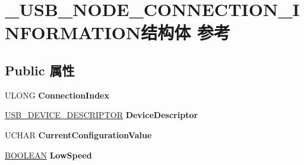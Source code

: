 \hypertarget{struct___u_s_b___n_o_d_e___c_o_n_n_e_c_t_i_o_n___i_n_f_o_r_m_a_t_i_o_n}{}\section{\+\_\+\+U\+S\+B\+\_\+\+N\+O\+D\+E\+\_\+\+C\+O\+N\+N\+E\+C\+T\+I\+O\+N\+\_\+\+I\+N\+F\+O\+R\+M\+A\+T\+I\+O\+N结构体 参考}
\label{struct___u_s_b___n_o_d_e___c_o_n_n_e_c_t_i_o_n___i_n_f_o_r_m_a_t_i_o_n}
\subsection*{Public 属性}
\begin{DoxyCompactItemize}
\item 
\mbox{\label{struct___u_s_b___n_o_d_e___c_o_n_n_e_c_t_i_o_n___i_n_f_o_r_m_a_t_i_o_n_a99e385dc6873d20dfe01bc77a3c994c9}} 
U\+L\+O\+NG {\bfseries Connection\+Index}
\item 
\mbox{\label{struct___u_s_b___n_o_d_e___c_o_n_n_e_c_t_i_o_n___i_n_f_o_r_m_a_t_i_o_n_a27e9c5b754a5b5a30ab646dc04860934}} 
\hyperlink{struct___u_s_b___d_e_v_i_c_e___d_e_s_c_r_i_p_t_o_r}{U\+S\+B\+\_\+\+D\+E\+V\+I\+C\+E\+\_\+\+D\+E\+S\+C\+R\+I\+P\+T\+OR} {\bfseries Device\+Descriptor}
\item 
\mbox{\label{struct___u_s_b___n_o_d_e___c_o_n_n_e_c_t_i_o_n___i_n_f_o_r_m_a_t_i_o_n_a25043404c6023c8195a577a19cf23ebf}} 
U\+C\+H\+AR {\bfseries Current\+Configuration\+Value}
\item 
\mbox{\label{struct___u_s_b___n_o_d_e___c_o_n_n_e_c_t_i_o_n___i_n_f_o_r_m_a_t_i_o_n_a91580c73c0c712aba057c8f343448125}} 
\hyperlink{_processor_bind_8h_a112e3146cb38b6ee95e64d85842e380a}{B\+O\+O\+L\+E\+AN} {\bfseries Low\+Speed}
\item 
\mbox{\label{struct___u_s_b___n_o_d_e___c_o_n_n_e_c_t_i_o_n___i_n_f_o_r_m_a_t_i_o_n_a4ab30160f9b9d75ed1b3a1d65de224fd}} 

\end{DoxyCompactItemize}
